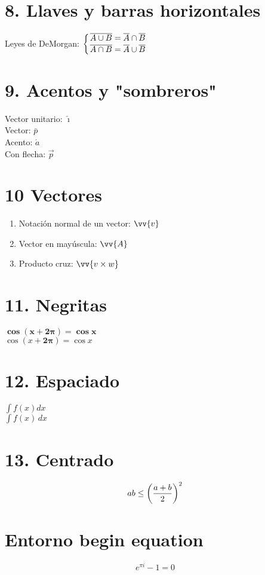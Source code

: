 \documentclass{article} %
\begin{document}
\section*{8. Llaves y barras horizontales}
Leyes de DeMorgan:
$\displaystyle{ \left\{{ \overline{A \cup B} = \overline{A} \cap
\overline{B}\atop\overline{A \cap B} = \overline{A}\cup
\overline{B}}\right.} $ 

\section*{9. Acentos y "sombreros"}
Vector unitario: $\hat{\imath}$ \\
Vector: $\bar{p}$ \\
Acento: $\acute{a}$ \\
Con flecha: $\vec{p}$ \\

\section*{10 Vectores}
\begin{enumerate}
\setlength\itemsep{1cm}
\item Notación normal de un vector: $\vv{v}$
\item Vector en may\'uscula: $\vv{A}$
\item Producto cruz: $\vv{v \times w}$
\end{enumerate}


\section*{11. Negritas}

$\pmb{\cos(x+2\pi)=\cos x}$ \\
$\cos(x+\pmb{2\pi})=\cos x$



\section*{12. Espaciado}
$\int f(x)dx$ \\
$\displaystyle{\int} f(x)\, dx$
\section*{13. Centrado}
\[ ab \leq \left( {a+b \over 2} \right)^2 \]
\section*{Entorno begin equation}
\begin{equation} \label{eu_eqn}
    e^{\pi i} - 1 = 0
\end{equation}
\end{document}
